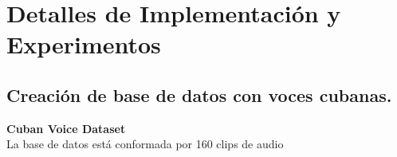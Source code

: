 \chapter{Detalles de Implementación y Experimentos}\label{chapter:implementation}


\section{Creación de base de datos con voces cubanas.}

\textbf{Cuban Voice Dataset}\\
La base de datos está conformada por 160 clips de audio

